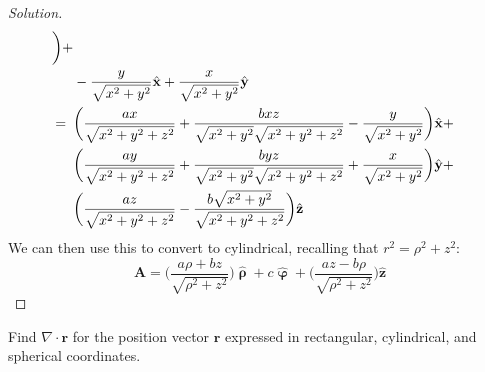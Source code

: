 \documentclass[crop=false,class=article,oneside]{standalone}
\begin{document}
\begin{proof}[Solution]
\begin{align*}
                \bigg)+\\
                &-\frac{y}{\sqrt{x^{2}+y^{2}}}\hat{\mathbf{x}}
                +\frac{x}{\sqrt{x^{2}+y^{2}}}\hat{\mathbf{y}}\\
                =\hspace{0.5em}
                &\bigg(
                    \frac{ax}{\sqrt{x^{2}+y^{2}+z^{2}}}
                    +\frac{bxz}
                          {\sqrt{x^{2}+y^{2}}
                           \sqrt{x^{2}+y^{2}+z^{2}}}
                    -\frac{y}{\sqrt{x^{2}+y^{2}}}
                \bigg)\hat{\mathbf{x}}+\\
                &\bigg(
                    \frac{ay}{\sqrt{x^{2}+y^{2}+z^{2}}}
                    +\frac{byz}
                          {\sqrt{x^{2}+y^{2}}
                           \sqrt{x^{2}+y^{2}+z^{2}}}
                        +\frac{x}{\sqrt{x^{2}+y^{2}}}
                \bigg)\hat{\mathbf{y}}+\\
                &\bigg(
                    \frac{az}{\sqrt{x^{2}+y^{2}+z^{2}}}
                    -\frac{b\sqrt{x^{2}+y^{2}}}
                          {\sqrt{x^{2}+y^{2}+z^{2}}}
                \bigg)
                \hat{\mathbf{z}}
            \end{align*}
            We can then use this to convert to cylindrical,
            recalling that $r^{2}=\rho^{2}+z^{2}$:
            \begin{equation*}
                \mathbf{A}
                =\bigg(
                    \frac{a\rho+bz}{\sqrt{\rho^{2}+z^{2}}}
                \bigg)
                \hat{\boldsymbol{\uprho}}
                +c\hat{\boldsymbol{\upvarphi}}
                +\bigg(
                    \frac{az-b\rho}{\sqrt{\rho^{2}+z^{2}}}
                \bigg)\hat{\mathbf{z}}
            \end{equation*}
        \end{proof}
        \begin{problem}[Wangsness 1-21]
            Find $\nabla\cdot\mathbf{r}$ for the position
            vector $\mathbf{r}$ expressed in rectangular,
            cylindrical, and spherical coordinates.
        \end{problem}
\end{document}

